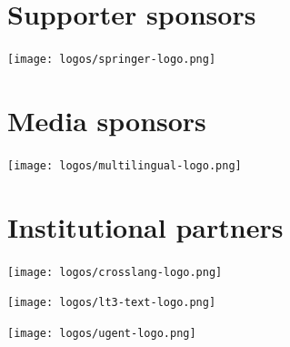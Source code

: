 \documentclass[a4paper,11pt,twoside]{book}
\begin{document}
\vfill

\section*{Supporter sponsors}
\begin{center}
\texttt{[image: logos/springer-logo.png]}
\end{center}

\vfill

\section*{Media sponsors}
\begin{center}
\texttt{[image: logos/multilingual-logo.png]}
\end{center}

\newpage
\section*{Institutional partners}

\begin{center}
\texttt{[image: logos/crosslang-logo.png]}\\
\vfill

\texttt{[image: logos/lt3-text-logo.png]}\\
\vfill

\texttt{[image: logos/ugent-logo.png]}
\end{center}

\vfill
\end{document}
